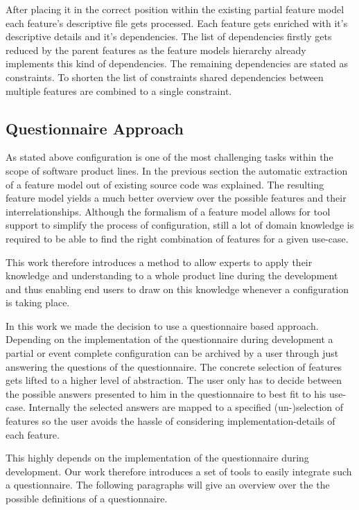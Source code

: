 After placing it in the correct position within the existing partial feature model each feature's descriptive file gets processed. Each feature gets enriched with it's descriptive details and it's dependencies. The list of dependencies firstly gets reduced by the parent features as the feature models hierarchy already implements this kind of dependencies. The remaining dependencies are stated as constraints. To shorten the list of constraints shared dependencies between multiple features are combined to a single constraint.

\subsection{Questionnaire Approach}
As stated above configuration is one of the most challenging tasks within the scope of software product lines. In the previous section the automatic extraction of a feature model out of existing source code was explained. The resulting feature model yields a much better overview over the possible features and their interrelationships. Although the formalism of a feature model allows for tool support to simplify the process of configuration, still a lot of domain knowledge is required to be able to find the right combination of features for a given use-case.

This work therefore introduces a method to allow experts to apply their knowledge and understanding to a whole product line during the development and thus enabling end users to draw on this knowledge whenever a configuration is taking place.

In this work we made the decision to use a questionnaire based approach. Depending on the implementation of the questionnaire during development a partial or event complete configuration can be archived by a user through just answering the questions of the questionnaire. The concrete selection of features gets lifted to a higher level of abstraction. The user only has to decide between the possible answers presented to him in the questionnaire to best fit to his use-case. Internally the selected answers are mapped to a specified (un-)selection of features so the user avoids the hassle of considering implementation-details of each feature.

This highly depends on the implementation of the questionnaire during development. Our work therefore introduces a set of tools to easily integrate such a questionnaire. The following paragraphs will give an overview over the the possible definitions of a questionnaire.

